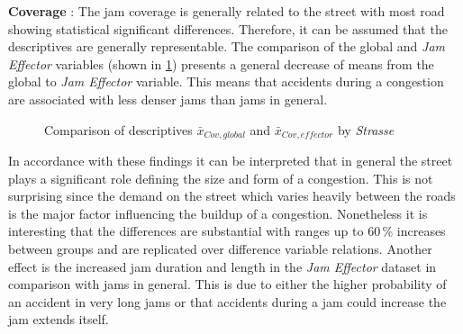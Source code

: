 \textbf{Coverage} : The jam coverage is generally related to the street with most road showing statistical significant differences. Therefore, it can be assumed that the descriptives are generally representable. The comparison of the global and \textit{Jam Effector} variables (shown in \cref{fig:baysis_summary_Str_coverage_barplot}) presents a general decrease of means from the global to \textit{Jam Effector} variable. This means that accidents during a congestion are associated with less denser jams than jams in general.
\begin{figure}[ht!]
    \data
    \pgfplotstablesort[sort key=means, sort cmp=float >]{\datasorted}{\data}
    \tiny
    \centering
    \caption{Comparison of descriptives $\bar{x}_{Cov,global}$ and $\bar{x}_{Cov,effector}$ by \textit{Strasse}}
    \label{fig:baysis_summary_Str_coverage_barplot}
\end{figure}
In accordance with these findings it can be interpreted that in general the street plays a significant role defining the size and form of a congestion. This is not surprising since the demand on the street which varies heavily between the roads is the major factor influencing the buildup of a congestion. Nonetheless it is interesting that the differences are substantial with ranges up to 60\,\% increases between groups and are replicated over difference variable relations. Another effect is the increased jam duration and length in the \textit{Jam Effector} dataset in comparison with jams in general. This is due to either the higher probability of an accident in very long jams or that accidents during a jam could increase the jam extends itself.

